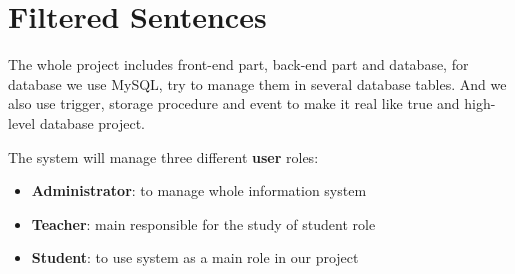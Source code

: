 \section{Filtered Sentences}
The whole project includes front-end part, back-end part and database, for database we use MySQL, try to manage them in several database tables.
And we also use trigger, storage procedure and event to make it real like true and high-level database project.

The system will manage three different \textbf{user} roles:
\begin{itemize}
    \item \textbf{Administrator}: to manage whole information system
    \item \textbf{Teacher}: main responsible for the study of student role
    \item \textbf{Student}: to use system as a main role in our project 
   
\end{itemize}





